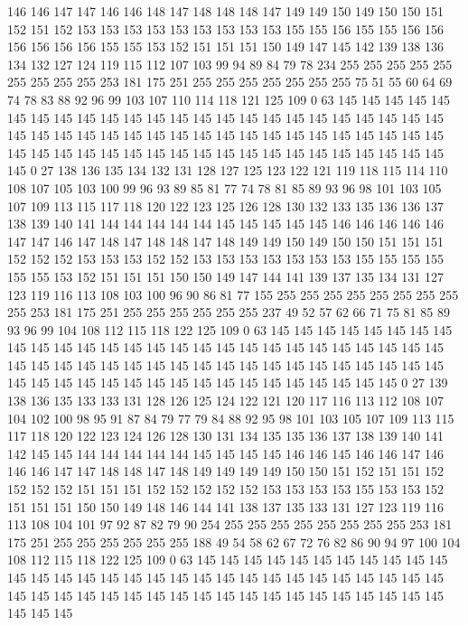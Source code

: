 146 146 147 147 146 146 148 147 148 148 148 147 149 149 150 149 150 150 151 152
151 152 153 153 153 153 153 153 153 153 153 155 155 156 155 155 156 156 156 156
156 156 155 155 153 152 151 151 151 150 149 147 145 142 139 138 136 134 132 127
124 119 115 112 107 103 99 94 89 84 79 78 234 255 255 255 255 255 255 255
255 255 253 181 175 251 255 255 255 255 255 255 255 75 51 55 60 64 69 74
78 83 88 92 96 99 103 107 110 114 118 121 125 109 0 63 145 145 145 145
145 145 145 145 145 145 145 145 145 145 145 145 145 145 145 145 145 145 145 145
145 145 145 145 145 145 145 145 145 145 145 145 145 145 145 145 145 145 145 145
145 145 145 145 145 145 145 145 145 145 145 145 145 145 145 145 145 145 145 0
27 138 136 135 134 132 131 128 127 125 123 122 121 119 118 115 114 110 108 107
105 103 100 99 96 93 89 85 81 77 74 78 81 85 89 93 96 98 101 103
105 107 109 113 115 117 118 120 122 123 125 126 128 130 132 133 135 136 136 137
138 139 140 141 144 144 144 144 144 145 145 145 145 145 146 146 146 146 146 147
147 146 147 148 147 148 148 147 148 149 149 150 149 150 150 151 151 151 152 152
152 153 153 153 152 152 153 153 153 153 153 153 153 155 155 155 155 155 155 153
152 151 151 151 150 150 149 147 144 141 139 137 135 134 131 127 123 119 116 113
108 103 100 96 90 86 81 77 155 255 255 255 255 255 255 255 255 255 253 181
175 251 255 255 255 255 255 255 237 49 52 57 62 66 71 75 81 85 89 93
96 99 104 108 112 115 118 122 125 109 0 63 145 145 145 145 145 145 145 145
145 145 145 145 145 145 145 145 145 145 145 145 145 145 145 145 145 145 145 145
145 145 145 145 145 145 145 145 145 145 145 145 145 145 145 145 145 145 145 145
145 145 145 145 145 145 145 145 145 145 145 145 145 145 145 0 27 139 138 136
135 133 133 131 128 126 125 124 122 121 120 117 116 113 112 108 107 104 102 100
98 95 91 87 84 79 77 79 84 88 92 95 98 101 103 105 107 109 113 115
117 118 120 122 123 124 126 128 130 131 134 135 135 136 137 138 139 140 141 142
145 145 144 144 144 144 144 145 145 145 145 146 146 145 146 146 147 146 146 146
147 147 148 148 147 148 149 149 149 149 150 150 151 152 151 151 152 152 152 152
151 151 151 152 152 152 152 152 153 153 153 153 155 153 153 152 151 151 151 150
150 149 148 146 144 141 138 137 135 133 131 127 123 119 116 113 108 104 101 97
92 87 82 79 90 254 255 255 255 255 255 255 255 255 253 181 175 251 255 255
255 255 255 255 188 49 54 58 62 67 72 76 82 86 90 94 97 100 104 108
112 115 118 122 125 109 0 63 145 145 145 145 145 145 145 145 145 145 145 145
145 145 145 145 145 145 145 145 145 145 145 145 145 145 145 145 145 145 145 145
145 145 145 145 145 145 145 145 145 145 145 145 145 145 145 145 145 145 145 145
